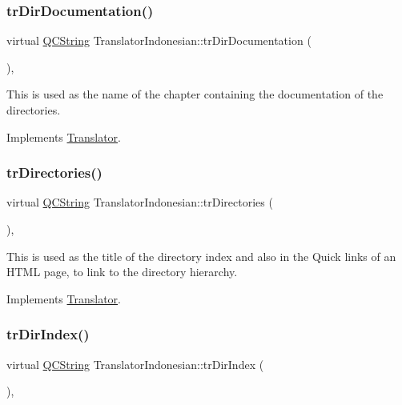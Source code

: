 \subsubsection{\texorpdfstring{trDirDocumentation()}{trDirDocumentation()}}
{\footnotesize\ttfamily virtual \mbox{\hyperlink{class_q_c_string}{Q\+C\+String}} Translator\+Indonesian\+::tr\+Dir\+Documentation (\begin{DoxyParamCaption}{ }\end{DoxyParamCaption})\hspace{0.3cm}{\ttfamily [inline]}, {\ttfamily [virtual]}}

This is used as the name of the chapter containing the documentation of the directories. 

Implements \mbox{\hyperlink{class_translator}{Translator}}.

\mbox{\label{class_translator_indonesian_ad02ff0b4defce647958f347763fab20d}} 
\subsubsection{\texorpdfstring{trDirectories()}{trDirectories()}}
{\footnotesize\ttfamily virtual \mbox{\hyperlink{class_q_c_string}{Q\+C\+String}} Translator\+Indonesian\+::tr\+Directories (\begin{DoxyParamCaption}{ }\end{DoxyParamCaption})\hspace{0.3cm}{\ttfamily [inline]}, {\ttfamily [virtual]}}

This is used as the title of the directory index and also in the Quick links of an H\+T\+ML page, to link to the directory hierarchy. 

Implements \mbox{\hyperlink{class_translator}{Translator}}.

\mbox{\label{class_translator_indonesian_a8159914635e87d6c5dda4c1ed48095c5}} 
\subsubsection{\texorpdfstring{trDirIndex()}{trDirIndex()}}
{\footnotesize\ttfamily virtual \mbox{\hyperlink{class_q_c_string}{Q\+C\+String}} Translator\+Indonesian\+::tr\+Dir\+Index (\begin{DoxyParamCaption}{ }\end{DoxyParamCaption})\hspace{0.3cm}{\ttfamily [inline]}, {\ttfamily [virtual]}}

